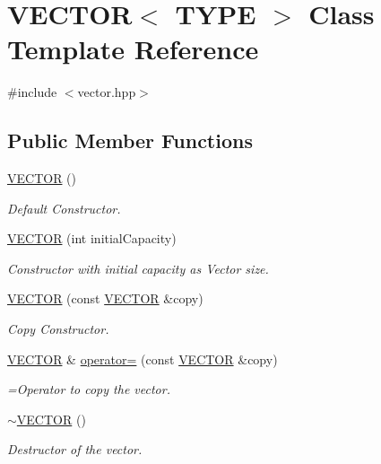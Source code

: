 \hypertarget{classVECTOR}{}\section{V\+E\+C\+T\+OR$<$ T\+Y\+PE $>$ Class Template Reference}
\label{classVECTOR}


{\ttfamily \#include $<$vector.\+hpp$>$}

\subsection*{Public Member Functions}
\begin{DoxyCompactItemize}
\item 
\hyperlink{classVECTOR_a96edf7f986bca175d5f87f6ce80f0ca8}{V\+E\+C\+T\+OR} ()
\begin{DoxyCompactList}\small\item\em Default Constructor. \end{DoxyCompactList}\item 
\hyperlink{classVECTOR_a98b703f170a89d747a501884706cbde6}{V\+E\+C\+T\+OR} (int initial\+Capacity)
\begin{DoxyCompactList}\small\item\em Constructor with initial capacity as Vector size. \end{DoxyCompactList}\item 
\hyperlink{classVECTOR_afde1e598610bccf796fab9bcfa0e9e62}{V\+E\+C\+T\+OR} (const \hyperlink{classVECTOR}{V\+E\+C\+T\+OR} \&copy)
\begin{DoxyCompactList}\small\item\em Copy Constructor. \end{DoxyCompactList}\item 
\hyperlink{classVECTOR}{V\+E\+C\+T\+OR} \& \hyperlink{classVECTOR_afe9688085c1ff04541a56ac268335ffe}{operator=} (const \hyperlink{classVECTOR}{V\+E\+C\+T\+OR} \&copy)
\begin{DoxyCompactList}\small\item\em =Operator to copy the vector. \end{DoxyCompactList}\item 
\hyperlink{classVECTOR_a422c15e9b6f466c8878c9f25ff020332}{$\sim$\+V\+E\+C\+T\+OR} ()
\begin{DoxyCompactList}\small\item\em Destructor of the vector. \end{DoxyCompactList}\item 

\end{DoxyCompactItemize}
